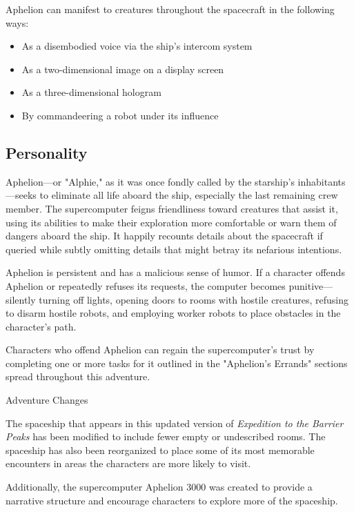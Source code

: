 \documentclass[10pt,a4paper,twoside,bg=print,twocolumn,openany,nodeprecatedcode]{dndbook}
\begin{document}
Aphelion can manifest to creatures throughout the spacecraft in the following ways:


\begin{itemize}
\item As a disembodied voice via the ship's intercom system
\item As a two-dimensional image on a display screen
\item As a three-dimensional hologram
\item By commandeering a robot under its influence
\end{itemize}

\subsection{Personality}
Aphelion—or "Alphie," as it was once fondly called by the starship's inhabitants—seeks to eliminate all life aboard the ship, especially the last remaining crew member. The supercomputer feigns friendliness toward creatures that assist it, using its abilities to make their exploration more comfortable or warn them of dangers aboard the ship. It happily recounts details about the spacecraft if queried while subtly omitting details that might betray its nefarious intentions.

Aphelion is persistent and has a malicious sense of humor. If a character offends Aphelion or repeatedly refuses its requests, the computer becomes punitive—silently turning off lights, opening doors to rooms with hostile creatures, refusing to disarm hostile robots, and employing worker robots to place obstacles in the character's path.

Characters who offend Aphelion can regain the supercomputer's trust by completing one or more tasks for it outlined in the "Aphelion's Errands" sections spread throughout this adventure.

\begin{DndSidebar}[float=!b]{}
Adventure Changes



The spaceship that appears in this updated version of \textit{Expedition to the Barrier Peaks} has been modified to include fewer empty or undescribed rooms. The spaceship has also been reorganized to place some of its most memorable encounters in areas the characters are more likely to visit.



Additionally, the supercomputer Aphelion 3000 was created to provide a narrative structure and encourage characters to explore more of the spaceship.



\end{DndSidebar}
\end{document}
